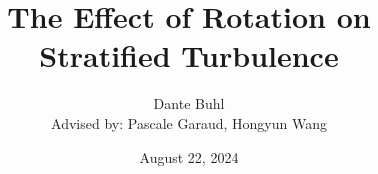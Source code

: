 \documentclass{beamer}
\title{The Effect of Rotation on Stratified Turbulence}
\author[Dante Buhl]{Dante Buhl\\{\scriptsize Advised by: Pascale Garaud, Hongyun Wang}}
\date{August 22, 2024}
\institute{UCSC Applied Mathematics}
\begin{document}
\newcommand{\wrms}{w_{\text{rms}}}
\newcommand{\bs}[1]{\boldsymbol{#1}}
\newcommand{\tb}[1]{\textbf{#1}}
\newcommand{\bmp}[1]{\begin{minipage}{#1\textwidth}}
\newcommand{\emp}{\end{minipage}}
\newcommand{\R}{\mathbb{R}}
\newcommand{\C}{\mathbb{C}}
\newcommand{\N}{\mathcal{N}}
\newcommand{\K}{\bs{\mathrm{K}}}
\newcommand{\m}{\bs{\mu}_*}
\newcommand{\s}{\bs{\Sigma}_*}
\newcommand{\dt}{\Delta t}
\newcommand{\dx}{\Delta x}
\newcommand{\tr}[1]{\text{Tr}(#1)}
\newcommand{\Tr}[1]{\text{Tr}(#1)}
\newcommand{\Div}{\nabla \cdot}
\renewcommand{\div}{\nabla \cdot}
\newcommand{\Curl}{\nabla \times}
\newcommand{\Grad}{\nabla}
\newcommand{\grad}{\nabla}
\newcommand{\grads}{\nabla_s}
\newcommand{\gradf}{\nabla_f}
\newcommand{\xs}{\bs{x}_s}
\newcommand{\xf}{\bs{x}_f}
\newcommand{\ts}{t_s}
\newcommand{\tf}{t_f}
\newcommand{\pt}{\partial t}
\newcommand{\pz}{\partial z}
\newcommand{\uvec}{\bs{u}}
\newcommand{\F}{\bs{F}}
\newcommand{\T}{\tilde{T}}
\newcommand{\ez}{\bs{e}_z}
\newcommand{\ex}{\bs{e}_x}
\newcommand{\ey}{\bs{e}_y}
\newcommand{\eo}{\bs{e}_{\bs{\Omega}}}
\newcommand{\ppt}[1]{\frac{\partial #1}{\partial t}}
\newcommand{\ppts}[1]{\frac{\partial #1}{\partial t_s}}
\newcommand{\pptf}[1]{\frac{\partial #1}{\partial t_f}}
\newcommand{\ppz}[1]{\frac{\partial #1}{\partial z}}
\newcommand{\ddz}[1]{\frac{d #1}{d z}}
\newcommand{\ppzetas}[1]{\frac{\partial^2 #1}{\partial \zeta^2}}
\newcommand{\ppzs}[1]{\frac{\partial #1}{\partial z_s}}
\newcommand{\ppzf}[1]{\frac{\partial #1}{\partial z_f}}
\newcommand{\ppx}[1]{\frac{\partial #1}{\partial x}}
\newcommand{\ppy}[1]{\frac{\partial #1}{\partial y}}
\newcommand{\ppzeta}[1]{\frac{\partial #1}{\partial \zeta}}


\begin{comment}
    1. Intro 
    2. Model
        - new forcing mechanism
    3. Previous Work?
        - Multiscale theory by Chini et al and Shahe et al
    4. Stochastically forced Stratified TurbulenceA
        - new horizontal structures in the flow
        - weak correlation between vertical vorticity and mixing
        - previous wmrs scalings aren't as effective
    5. Rotating Stratified Turbulence
        - new flow structures (columns appear in the flow)
        - mixinng is localized to anti-cyclones
        - inverse energy cascade to small horizontal wavenumbers
        - decline in vertical mixing 
        
\end{comment}

\frame{\titlepage}
\end{document}
